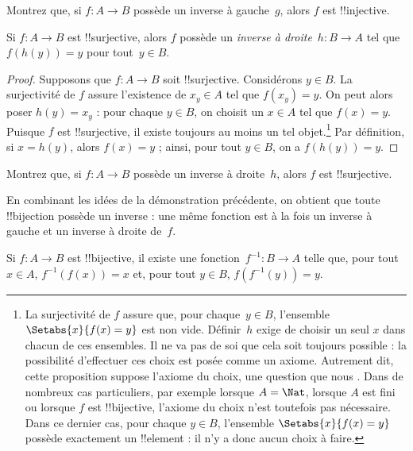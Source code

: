 \documentclass[11pt,a4paper,openany]{memoir}
\begin{document}
\begin{prob}
Montrez que, si $f\colon A \to B$ possède un inverse à gauche~$g$,
alors $f$ est !!{injective}.
\end{prob}

\begin{prop}
Si $f\colon A \to B$ est !!{surjective}, alors $f$ possède un
\emph{inverse à droite}~$h\colon B \to A$ tel que $f(h(y)) = y$
pour tout~$y \in B$.
\end{prop}

\begin{proof}
Supposons que $f\colon A \to B$ soit !!{surjective}. Considérons
$y \in B$. La surjectivité de $f$ assure l’existence de $x_y \in A$
tel que $f(x_y) = y$. On peut alors poser $h(y) = x_y$ : pour chaque
$y \in B$, on choisit un $x \in A$ tel que $f(x) = y$.
Puisque $f$ est !!{surjective}, il existe toujours au moins un tel
objet.\footnote{La surjectivité de $f$ assure que, pour chaque~$y \in B$,
l’ensemble $\Setabs{x}{f(x) = y}$ est non vide. Définir~$h$ exige de
choisir un seul $x$ dans chacun de ces ensembles. Il ne va pas de soi
que cela soit toujours possible : la possibilité d’effectuer ces choix
est posée comme un axiome. Autrement dit, cette proposition suppose
l’axiome du choix, une question que nous
.
Dans de nombreux cas particuliers, par exemple lorsque $A = \Nat$,
lorsque $A$ est fini ou lorsque $f$ est !!{bijective}, l’axiome du choix
n’est toutefois pas nécessaire. Dans ce dernier cas, pour chaque $y \in B$,
l’ensemble $\Setabs{x}{f(x) = y}$ possède exactement un !!{element} :
il n’y a donc aucun choix à faire.}
Par définition, si $x = h(y)$, alors $f(x) = y$ ; ainsi,
pour tout $y \in B$, on a $f(h(y)) = y$.
\end{proof}

\begin{prob}
Montrez que, si $f\colon A \to B$ possède un inverse à droite~$h$,
alors $f$ est !!{surjective}.
\end{prob}

\begin{explain}
En combinant les idées de la démonstration précédente, on obtient que
toute !!{bijection} possède un inverse : une même fonction est à la fois
un inverse à gauche et un inverse à droite de~$f$.
\end{explain}

\begin{prop}
Si $f\colon A \to B$ est !!{bijective}, il existe une
fonction~$f^{-1}\colon B \to A$ telle que, pour tout $x \in A$,
$f^{-1}(f(x)) = x$ et, pour tout $y \in B$, $f(f^{-1}(y)) = y$.
\end{prop}
\end{document}
